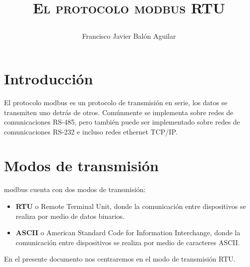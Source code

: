 \documentclass[11pt, twosides, titlepage]{article}
\title{{\scshape\Huge El protocolo modbus RTU\par}}
\author{Francisco Javier Balón Aguilar}
\begin{document}
\maketitle
\renewcommand{\contentsname}{Índice de contenidos} %
\tableofcontents %
\newpage

\listoffigures
\newpage

\listoftables
\newpage

\section{Introducción}

    El protocolo modbus es un protocolo de transmisión en serie, los datos se transmiten uno detrás de 
    otros. Comúnmente se implementa sobre redes de comunicaciones RS-485, pero también puede ser implementado
    sobre redes de comunicaciones RS-232 e incluso redes ethernet TCP/IP.

\section{Modos de transmisión}

    modbus cuenta con dos modos de transmisión:

    \begin{itemize}
        \item \textbf{RTU} o Remote Terminal Unit, donde la comunicación entre dispositivos se realiza 
        por medio de datos binarios.
        \item \textbf{ASCII} o American Standard Code for Information Interchange, donde la comunicación 
        entre dispositivos se realiza por medio de caracteres ASCII.
    \end{itemize}

    En el presente documento nos centraremos en el modo de transmisión RTU.
\end{document}
